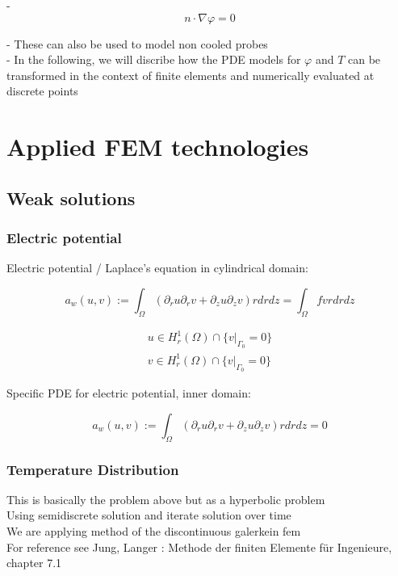 \documentclass[parskip=half, titlepage=yes, 12pt, BCOR=12mm, DIV=calc]{scrartcl}
\begin{document}
- \begin{equation}
    n \cdot \nabla \varphi = 0
\end{equation}

- These can also be used to model non cooled probes \\

- In the following, we will discribe how the PDE models for $\varphi$ and $T$ can be transformed in the context of finite elements and numerically evaluated at discrete points \\


\section{Applied FEM technologies}

\subsection{Weak solutions}
\subsubsection{Electric potential}

Electric potential / Laplace's equation in cylindrical domain:

\begin{equation}
    a_w(u,v) := \int_{\Omega} (\partial_r u \partial_r v + \partial_z u \partial_z v) r drdz = \int_{\Omega} f v r dr dz
\end{equation}

\begin{align}
    u \in H_r^1(\Omega) \cap \{v|_{\Gamma_{0}} = 0 \} \\
    v \in H_r^1(\Omega) \cap \{v|_{\Gamma_{0}} = 0 \}     
\end{align}


Specific PDE for electric potential, inner domain: 

\begin{equation}
    a_w(u,v) := \int_{\Omega} (\partial_r u \partial_r v + \partial_z u \partial_z v) r drdz = 0 
\end{equation}

\subsubsection{Temperature Distribution}

This is basically the problem above but as a hyperbolic problem \\
Using semidiscrete solution and iterate solution over time \\
We are applying method of the discontinuous galerkein fem \\
For reference see Jung, Langer : Methode der finiten Elemente für Ingenieure, chapter 7.1 \\
\end{document}
